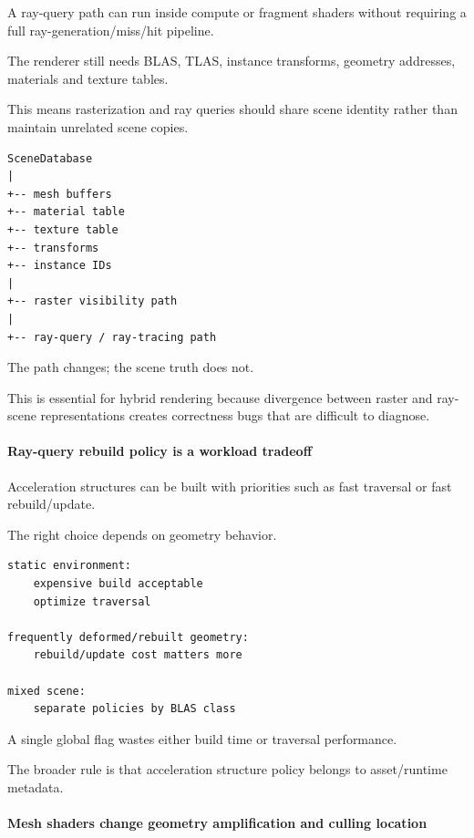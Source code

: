 A ray-query path can run inside compute or fragment shaders without requiring a full ray-generation/miss/hit pipeline.

The renderer still needs BLAS, TLAS, instance transforms, geometry addresses, materials and texture tables.

This means rasterization and ray queries should share scene identity rather than maintain unrelated scene copies.

\begin{verbatim}
SceneDatabase
|
+-- mesh buffers
+-- material table
+-- texture table
+-- transforms
+-- instance IDs
|
+-- raster visibility path
|
+-- ray-query / ray-tracing path
\end{verbatim}

The path changes; the scene truth does not.

This is essential for hybrid rendering because divergence between raster and ray-scene representations creates correctness bugs that are difficult to diagnose.

\paragraph{Ray-query rebuild policy is a workload tradeoff}\label{ray-query-rebuild-policy-is-a-workload-tradeoff}

Acceleration structures can be built with priorities such as fast traversal or fast rebuild/update.

The right choice depends on geometry behavior.

\begin{verbatim}
static environment:
    expensive build acceptable
    optimize traversal

frequently deformed/rebuilt geometry:
    rebuild/update cost matters more

mixed scene:
    separate policies by BLAS class
\end{verbatim}

A single global flag wastes either build time or traversal performance.

The broader rule is that acceleration structure policy belongs to asset/runtime metadata.

\paragraph{Mesh shaders change geometry amplification and culling location}\label{mesh-shaders-change-geometry-amplification-and-culling-location}

